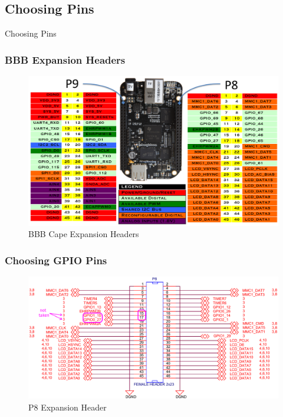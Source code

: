\subsection{Choosing Pins}

\begin{frame}[standout]
  Choosing Pins
\end{frame}

\begin{frame}
  \frametitle{BBB Expansion Headers}
  \begin{figure}
    \centering
    \includegraphics[scale=0.29]{images/expansion-headers.png}
    \caption{BBB Cape Expansion Headers}
  \end{figure}
  \vspace*{-10mm}
\end{frame}

\begin{frame}
  \frametitle{Choosing GPIO Pins}
  \begin{figure}
    \centering
    \includegraphics[scale=0.29]{images/p8.png}
    \caption{P8 Expansion Header}
  \end{figure}
  \vspace*{-10mm}
\end{frame}

